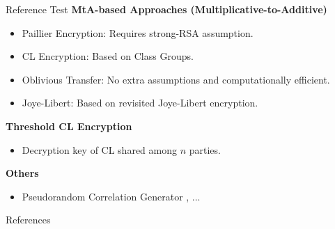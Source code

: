 \documentclass[10pt,aspectratio=1610]{beamer}
\begin{document}
\begin{frame}{Reference Test}
\textbf{MtA-based Approaches (Multiplicative-to-Additive)}
    \begin{itemize}
        \item Paillier Encryption: Requires strong-RSA assumption.
        \\
        \cite{GGN16/gennaro2016threshold, Lin17/lindell2021fast, GG18/gennaro2018fast, CGG20+/canetti2020uc, XLX24/xie2024direct}
        \item CL Encryption: Based on Class Groups.
        \\
        \cite{CLL+19/castagnos2019two, CCL+20/castagnos2020bandwidth, YCX21/yuen2021compact, DMA+21/deng2021promise}
        \item Oblivious Transfer: No extra assumptions and computationally efficient.
        \\
        \cite{DKLs18/doerner2018secure, DKLs19/doerner2019threshold, DKLs23/doerner2024threshold}
        \item Joye-Libert: Based on revisited Joye-Libert encryption.
        \\
        \cite{XAL+23/xue2023efficient}
    \end{itemize}

\textbf{Threshold CL Encryption}
    \begin{itemize}
        \item Decryption key of CL shared among $n$ parties.
        \\
        \cite{BDO23/braun2023secure, WMY23/wong2023real, WMC24/wong2024secure, TX25/tang2025robust, JTX25/jiang2025three}
    \end{itemize}

\textbf{Others}
\begin{itemize}
    \item Pseudorandom Correlation Generator \cite{ANO+22/abram2022low}, ...
\end{itemize}
    
\end{frame}

\begin{frame}[allowframebreaks]{References}
    \linespread{0.8}\selectfont
    \setlength{\itemsep}{0pt}
    \setlength{\parskip}{0pt}
    \printbibliography[heading=none]
\end{frame}

\backmatter
\end{document}
